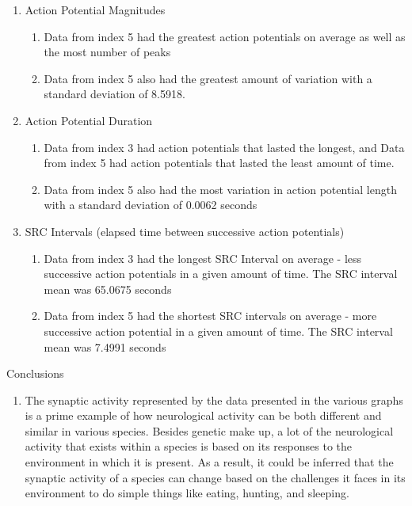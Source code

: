 \begin{enumerate}
\def\labelenumi{\arabic{enumi}.}
\item
  Action Potential Magnitudes

  \begin{enumerate}
  \def\labelenumii{\alph{enumii}.}
  \item
    Data from index 5 had the greatest action potentials on average as
    well as the most number of peaks
  \item
    Data from index 5 also had the greatest amount of variation with a
    standard deviation of 8.5918.
  \end{enumerate}
\item
  Action Potential Duration

  \begin{enumerate}
  \def\labelenumii{\alph{enumii}.}
  \item
    Data from index 3 had action potentials that lasted the longest, and
    Data from index 5 had action potentials that lasted the least amount
    of time.
  \item
    Data from index 5 also had the most variation in action potential
    length with a standard deviation of 0.0062 seconds
  \end{enumerate}
\item
  SRC Intervals (elapsed time between successive action potentials)

  \begin{enumerate}
  \def\labelenumii{\alph{enumii}.}
  \item
    Data from index 3 had the longest SRC Interval on average - less
    successive action potentials in a given amount of time. The SRC
    interval mean was 65.0675 seconds
  \item
    Data from index 5 had the shortest SRC intervals on average - more
    successive action potential in a given amount of time. The SRC
    interval mean was 7.4991 seconds
  \end{enumerate}
\end{enumerate}

Conclusions

\begin{enumerate}
\def\labelenumi{\arabic{enumi}.}
\item
  The synaptic activity represented by the data presented in the various
  graphs is a prime example of how neurological activity can be both
  different and similar in various species. Besides genetic make up, a
  lot of the neurological activity that exists within a species is based
  on its responses to the environment in which it is present. As a
  result, it could be inferred that the synaptic activity of a species
  can change based on the challenges it faces in its environment to do
  simple things like eating, hunting, and sleeping.
\end{enumerate}

